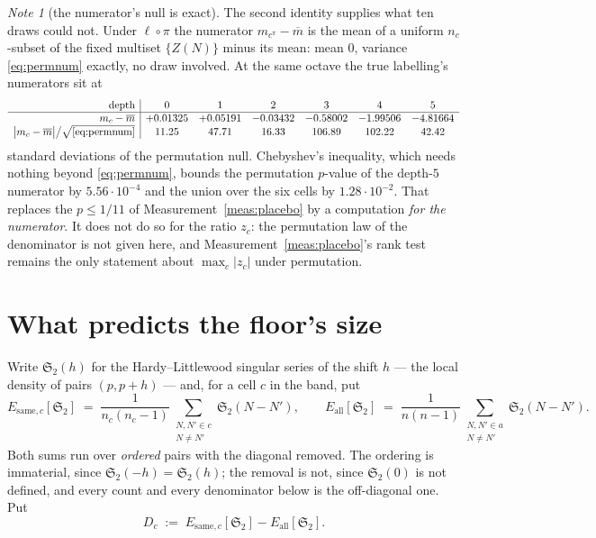 \documentclass[11pt,a4paper]{article}
\theoremstyle{plain}
\theoremstyle{definition}
\theoremstyle{remark}
\newtheorem{note}[theorem]{Note}
\renewcommand{\SS}{\mathfrak{S}}
\begin{document}
\begin{note}[the numerator's null is exact]\label{note:numnull}
The second identity supplies what ten draws could not. Under
$\ell\circ\pi$ the numerator $m_{c^\pi}-\overline m$ is the mean of a
uniform $n_c$-subset of the fixed multiset $\{Z(N)\}$ minus its mean:
mean $0$, variance \eqref{eq:permnum} exactly, no draw involved. At
the same octave the true labelling's numerators sit at
\[
\begin{array}{r|cccccc}
 \text{depth} & 0 & 1 & 2 & 3 & 4 & 5\\\hline
 m_c-\overline m & +0.01325 & +0.05191 & -0.03432 & -0.58002
   & -1.99506 & -4.81664\\
 \bigl|m_c-\overline m\bigr|\big/\sqrt{\eqref{eq:permnum}}
   & 11.25 & 47.71 & 16.33 & 106.89 & 102.22 & 42.42
\end{array}
\]
standard deviations of the permutation null. Chebyshev's inequality,
which needs nothing beyond \eqref{eq:permnum}, bounds the permutation
$p$-value of the depth-$5$ numerator by $5.56\cdot10^{-4}$ and the
union over the six cells by $1.28\cdot10^{-2}$. That replaces the
$p\le1/11$ of Measurement~\ref{meas:placebo} by a computation
\emph{for the numerator}. It does not do so for the ratio $z_c$: the
permutation law of the denominator is not given here, and
Measurement~\ref{meas:placebo}'s rank test remains the only statement
about $\max_c|z_c|$ under permutation.
\end{note}

\section{What predicts the floor's size}\label{sec:size}

Write $\SS_2(h)$ for the Hardy--Littlewood singular series of the
shift $h$ --- the local density of pairs $(p,p+h)$ --- and, for a cell
$c$ in the band, put
\[
  E_{\mathrm{same},c}[\SS_2]
  \;=\;\frac{1}{n_c(n_c-1)}\sum_{\substack{N,N'\in c\\ N\neq N'}}\SS_2(N-N'),
  \qquad
  E_{\mathrm{all}}[\SS_2]
  \;=\;\frac{1}{n(n-1)}\sum_{\substack{N,N'\in a\\ N\neq N'}}\SS_2(N-N').
\]
Both sums run over \emph{ordered} pairs with the diagonal removed. The
ordering is immaterial, since $\SS_2(-h)=\SS_2(h)$; the removal is not,
since $\SS_2(0)$ is not defined, and every count and every denominator
below is the off-diagonal one. Put
\begin{equation}\label{eq:Dc}
  D_c\;:=\;E_{\mathrm{same},c}[\SS_2]-E_{\mathrm{all}}[\SS_2].
\end{equation}
\end{document}
